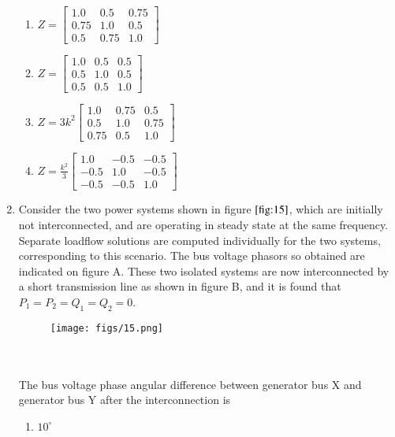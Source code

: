 \documentclass[journal]{IEEEtran}
\numberwithin{equation}{enumi}
\numberwithin{figure}{enumi}
\begin{document}
\begin{enumerate}
    \begin{multicols}{2}
    \begin{enumerate}
        \item $ Z = \begin{bmatrix} 1.0 & 0.5 & 0.75 \\ 0.75 & 1.0 & 0.5 \\ 0.5 & 0.75 & 1.0 \end{bmatrix} $
        \item $ Z = \begin{bmatrix} 1.0 & 0.5 & 0.5 \\ 0.5 & 1.0 & 0.5 \\ 0.5 & 0.5 & 1.0 \end{bmatrix} $
        \item $ Z = 3k^2 \begin{bmatrix} 1.0 & 0.75 & 0.5 \\ 0.5 & 1.0 & 0.75 \\ 0.75 & 0.5 & 1.0 \end{bmatrix} $
        \item $ Z = \frac{k^2}{3} \begin{bmatrix} 1.0 & -0.5 & -0.5 \\ -0.5 & 1.0 & -0.5 \\ -0.5 & -0.5 & 1.0 \end{bmatrix} $
    \end{enumerate}
    \end{multicols}
\bigskip
    \item Consider the two power systems shown in figure $\ref{fig:15}$, which are initially not interconnected, and are operating in steady state at the same frequency. Separate loadflow solutions are computed individually for the two systems, corresponding to this scenario. The bus voltage phasors so obtained are indicated on figure A. These two isolated systems are now interconnected by a short transmission line as shown in figure B, and it is found that $P_1 = P_2 = Q_1 = Q_2 = 0$.
    \begin{figure}[!ht]
    \centering
    \texttt{[image: figs/15.png]}
    \caption{}
    \label{fig:15}
    \end{figure}
    \\\\The bus voltage phase angular difference between generator bus X and generator bus Y after the interconnection is
    \begin{multicols}{4}
    \begin{enumerate}
        \item $10^\circ$

\end{enumerate}
\end{multicols}
\end{enumerate}
\end{document}
